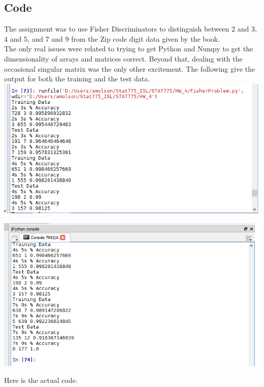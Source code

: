 \documentclass[paper=a4, fontsize=11pt]{scrartcl} %
\numberwithin{equation}{section} %
\numberwithin{figure}{section} %
\numberwithin{table}{section} %
\theoremstyle{statement}
\begin{document}
\subsection{Code}

The assignment was to use Fisher Discriminators to distinguish between 2 and 3, 4 and 5, and 7 and 9 from the Zip code digit data given by the book. \\

The only real issues were related to trying to get Python and Numpy to get the dimensionality of arrays and matrices correct. Beyond that, dealing with the occasional singular matrix was the only other excitement. The following give the output for both the training and the test data.\\

\includegraphics[scale=0.6]{Fisher1.png}

\includegraphics[scale=0.6]{Fisher2.png}  

\pagebreak
Here is the actual code. \\
\end{document}
